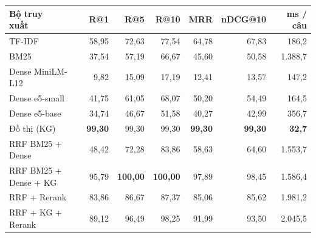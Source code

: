 \begin{tabular}{lrrrrrr}
\toprule
\makecell[l]{Bộ truy\\xuất} & R@1 & R@5 & R@10 & MRR & nDCG@10 & ms / câu \\
\midrule
TF-IDF & 58{,}95 & 72{,}63 & 77{,}54 & 64{,}78 & 67{,}83 & 186{,}2 \\
BM25 & 37{,}54 & 57{,}19 & 66{,}67 & 45{,}60 & 50{,}58 & 1{.}388{,}7 \\
Dense MiniLM-L12 & 9{,}82 & 15{,}09 & 17{,}19 & 12{,}41 & 13{,}57 & 147{,}2 \\
Dense e5-small & 41{,}75 & 61{,}05 & 68{,}07 & 50{,}20 & 54{,}49 & 164{,}5 \\
Dense e5-base & 34{,}74 & 46{,}67 & 51{,}58 & 40{,}27 & 42{,}99 & 356{,}7 \\
Đồ thị (KG) & \textbf{99{,}30} & 99{,}30 & 99{,}30 & \textbf{99{,}30} & \textbf{99{,}30} & \textbf{32{,}7} \\
RRF BM25 + Dense & 48{,}42 & 72{,}28 & 83{,}86 & 58{,}63 & 64{,}60 & 1{.}553{,}7 \\
RRF BM25 + Dense + KG & 95{,}79 & \textbf{100{,}00} & \textbf{100{,}00} & 97{,}89 & 98{,}45 & 1{.}586{,}4 \\
RRF + Rerank & 83{,}86 & 86{,}67 & 87{,}37 & 85{,}06 & 85{,}62 & 1{.}981{,}2 \\
RRF + KG + Rerank & 89{,}12 & 96{,}49 & 98{,}25 & 91{,}99 & 93{,}50 & 2{.}045{,}5 \\
\bottomrule
\end{tabular}
